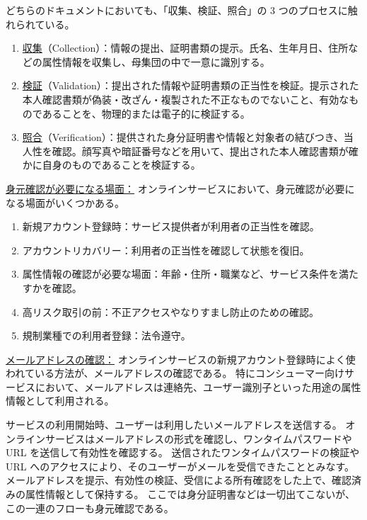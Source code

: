 \documentclass[uplatex]{jsarticle}
\def\label#1{}%
\begin{document}
どちらのドキュメントにおいても、「収集、検証、照合」の 3 つのプロセスに触れられている。

\begin{dfn}\label{dfn:ch2-proofing-processes}
\begin{enumerate}
\item \underline{収集}（Collection）：情報の提出、証明書類の提示。氏名、生年月日、住所などの属性情報を収集し、母集団の中で一意に識別する。
\item \underline{検証}（Validation）：提出された情報や証明書類の正当性を検証。提示された本人確認書類が偽装・改ざん・複製された不正なものでないこと、有効なものであることを、物理的または電子的に検証する。
\item \underline{照合}（Verification）：提供された身分証明書や情報と対象者の結びつき、当人性を確認。顔写真や暗証番号などを用いて、提出された本人確認書類が確かに自身のものであることを検証する。
\end{enumerate}
\end{dfn}

\underline{身元確認が必要になる場面：}
オンラインサービスにおいて、身元確認が必要になる場面がいくつかある。
\begin{enumerate}
\item 新規アカウント登録時：サービス提供者が利用者の正当性を確認。
\item アカウントリカバリー：利用者の正当性を確認して状態を復旧。
\item 属性情報の確認が必要な場面：年齢・住所・職業など、サービス条件を満たすかを確認。
\item 高リスク取引の前：不正アクセスやなりすまし防止のための確認。
\item 規制業種での利用者登録：法令遵守。
\end{enumerate}

\underline{メールアドレスの確認：}
オンラインサービスの新規アカウント登録時によく使われている方法が、メールアドレスの確認である。
特にコンシューマー向けサービスにおいて、メールアドレスは連絡先、ユーザー識別子といった用途の属性情報として利用される。

\begin{exa}[メールアドレスの確認も身元確認の一つ]\label{exa:ch2-email-verification}
サービスの利用開始時、ユーザーは利用したいメールアドレスを送信する。
オンラインサービスはメールアドレスの形式を確認し、ワンタイムパスワードや URL を送信して有効性を確認する。
送信されたワンタイムパスワードの検証や URL へのアクセスにより、そのユーザーがメールを受信できたこととみなす。
メールアドレスを提示、有効性の検証、受信による所有確認をした上で、確認済みの属性情報として保持する。
ここでは身分証明書などは一切出てこないが、この一連のフローも身元確認である。
\end{exa}
\end{document}
